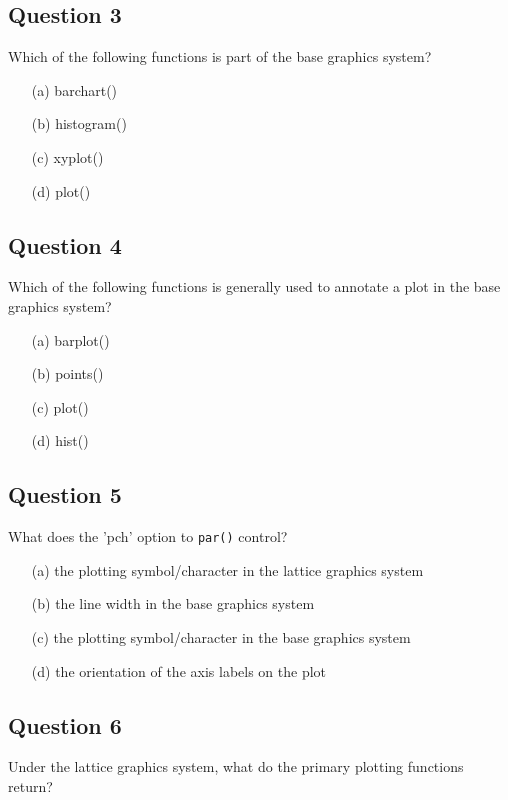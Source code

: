 \documentclass[12pt]{article}
\begin{document}
\subsection*{Question 3}
Which of the following functions is part of the base graphics system?

\begin{itemize}
\item[(a)] barchart()
\item[(b)] histogram()
\item[(c)] xyplot()
\item[(d)] plot()
\end{itemize}
\subsection*{Question 4}
Which of the following functions is generally used to annotate a plot in the base graphics system?
\begin{itemize}
\item[(a)] barplot()
\item[(b)] points()
\item[(c)] plot()
\item[(d)] hist()
\end{itemize}




\subsection*{Question 5}
What does the 'pch' option to \texttt{par()} control?


\begin{itemize}
\item[(a)] the plotting symbol/character in the lattice graphics system
\item[(b)] the line width in the base graphics system
\item[(c)] the plotting symbol/character in the base graphics system
\item[(d)] the orientation of the axis labels on the plot
\end{itemize}





\subsection*{Question 6}
Under the lattice graphics system, what do the primary plotting functions return?
\end{document}
